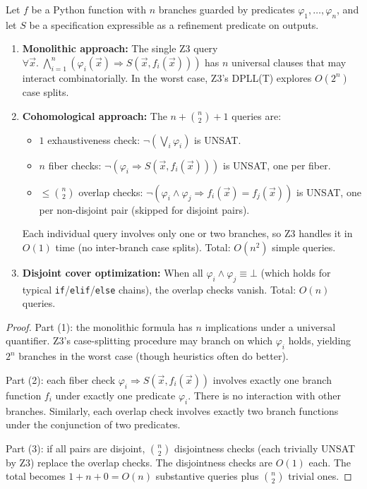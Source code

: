\begin{theorem}
\label{thm:complexity}
Let $f$ be a Python function with $n$ branches guarded by
predicates $\varphi_1, \ldots, \varphi_n$, and let $S$ be a
specification expressible as a refinement predicate on outputs.
\begin{enumerate}
\item \textbf{Monolithic approach:} The single Z3 query
  $\forall \vec{x}.\; \bigwedge_{i=1}^n (\varphi_i(\vec{x})
  \Rightarrow S(\vec{x}, f_i(\vec{x})))$
  has $n$ universal clauses that may interact combinatorially.
  In the worst case, Z3's DPLL(T) explores $O(2^n)$
  case splits.

\item \textbf{Cohomological approach:} The $n + \binom{n}{2} + 1$
  queries are:
  \begin{itemize}
  \item $1$ exhaustiveness check:
    $\neg(\bigvee_i \varphi_i)$ is UNSAT.
  \item $n$ fiber checks:
    $\neg(\varphi_i \Rightarrow S(\vec{x}, f_i(\vec{x})))$ is UNSAT,
    one per fiber.
  \item $\leq \binom{n}{2}$ overlap checks:
    $\neg(\varphi_i \wedge \varphi_j \Rightarrow
    f_i(\vec{x}) = f_j(\vec{x}))$ is UNSAT,
    one per non-disjoint pair (skipped for disjoint pairs).
  \end{itemize}
  Each individual query involves only one or two branches, so Z3
  handles it in $O(1)$ time (no inter-branch case splits).
  Total: $O(n^2)$ simple queries.

\item \textbf{Disjoint cover optimization:} When all
  $\varphi_i \wedge \varphi_j \equiv \bot$ (which holds for
  typical \texttt{if}/\texttt{elif}/\texttt{else} chains),
  the overlap checks vanish.  Total: $O(n)$ queries.
\end{enumerate}
\end{theorem}

\begin{proof}
Part (1): the monolithic formula has $n$ implications under a
universal quantifier.  Z3's case-splitting procedure may branch
on which $\varphi_i$ holds, yielding $2^n$ branches in the
worst case (though heuristics often do better).

Part (2): each fiber check $\varphi_i \Rightarrow S(\vec{x},
f_i(\vec{x}))$ involves exactly one branch function $f_i$ under
exactly one predicate $\varphi_i$.  There is no interaction with
other branches.  Similarly, each overlap check involves exactly
two branch functions under the conjunction of two predicates.

Part (3): if all pairs are disjoint, $\binom{n}{2}$ disjointness
checks (each trivially UNSAT by Z3) replace the overlap checks.
The disjointness checks are $O(1)$ each.  The total becomes
$1 + n + 0 = O(n)$ substantive queries plus $\binom{n}{2}$
trivial ones.
\end{proof}

